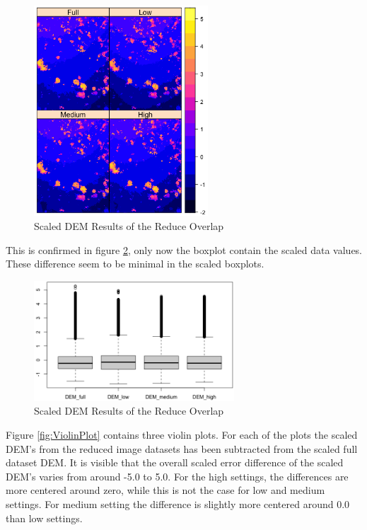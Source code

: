 \documentclass{isprs} %
\begin{document}
\begin{figure}[h]
    \centering
    \includegraphics[width=6.5cm]{DEM2x2_scaled.png}
    \caption{Scaled DEM Results of the Reduce Overlap}
    \label{fig:DemPlot_scaled}
\end{figure}

This is confirmed in figure \ref{fig:BoxPlot_scaled}, only now the boxplot contain the scaled data values.
These difference seem to be minimal in the scaled boxplots.

\begin{figure}[h!]
    \centering
    \includegraphics[width=7.5cm]{DemBoxPlot_Scaled.png}
    \caption{Scaled DEM Results of the Reduce Overlap}
    \label{fig:BoxPlot_scaled}
\end{figure}

Figure \ref{fig:ViolinPlot} contains three violin plots. For each of the plots the scaled DEM's from the reduced image datasets has been subtracted from the scaled full dataset DEM.
It is visible that the overall scaled error difference of the scaled DEM's varies from around -5.0 to 5.0.
For the high settings, the differences are more centered around zero, while this is not the case for low and medium settings.
For medium setting the difference is slightly more centered around 0.0 than low settings.
\end{document}
